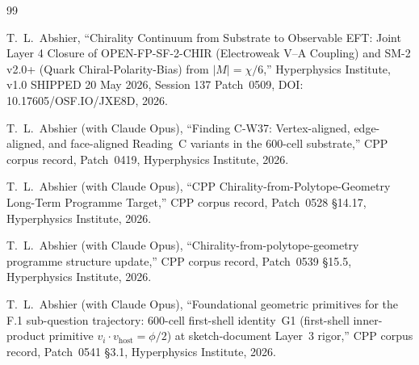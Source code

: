 \documentclass[11pt,letterpaper]{article}
\begin{document}

\begin{thebibliography}{99}


T.~L.~Abshier,
``Chirality Continuum from Substrate to Observable EFT: Joint Layer 4 Closure of OPEN-FP-SF-2-CHIR (Electroweak V--A Coupling) and SM-2 v2.0+ (Quark Chiral-Polarity-Bias) from $|M| = \chi/6$,''
Hyperphysics Institute, v1.0 SHIPPED 20 May 2026, Session 137 Patch~0509,
DOI: 10.17605/OSF.IO/JXE8D, 2026.

T.~L.~Abshier (with Claude Opus),
``Finding C-W37: Vertex-aligned, edge-aligned, and face-aligned Reading~C variants in the 600-cell substrate,''
CPP corpus record, Patch~0419, Hyperphysics Institute, 2026.

T.~L.~Abshier (with Claude Opus),
``CPP Chirality-from-Polytope-Geometry Long-Term Programme Target,''
CPP corpus record, Patch~0528 \S14.17, Hyperphysics Institute, 2026.

T.~L.~Abshier (with Claude Opus),
``Chirality-from-polytope-geometry programme structure update,''
CPP corpus record, Patch~0539 \S15.5, Hyperphysics Institute, 2026.

T.~L.~Abshier (with Claude Opus),
``Foundational geometric primitives for the F.1 sub-question trajectory: 600-cell first-shell identity~G1 (first-shell inner-product primitive $v_i \cdot v_{\text{host}} = \phi/2$) at sketch-document Layer~3 rigor,''
CPP corpus record, Patch~0541 \S3.1, Hyperphysics Institute, 2026.


\end{thebibliography}
\end{document}
